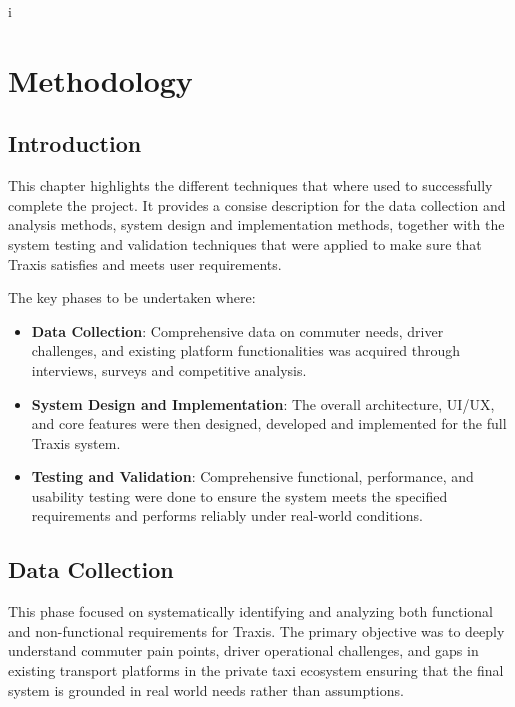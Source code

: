 i\chapter{Methodology}

\label{chap:methodology}

\section{Introduction}
This chapter highlights the different techniques that where used to successfully
complete the project. It provides a consise description for the data collection
and analysis methods, system design and implementation methods, together with
the system testing and validation techniques that were applied to make sure that
Traxis satisfies and meets user requirements. \vspace{1cm}


The key phases to be undertaken where:


\begin{itemize}
 \item \textbf{Data Collection}: Comprehensive data on commuter needs,
        driver challenges, and existing platform functionalities was acquired
        through interviews, surveys and competitive analysis.

 \item \textbf{System Design and Implementation}: The  overall
        architecture, UI/UX, and core features were then designed, developed and
        implemented for the full Traxis system.

 \item \textbf{Testing and Validation}: Comprehensive functional,
        performance, and usability testing were done to ensure the system meets
        the specified requirements and performs reliably under real-world
        conditions.

\end{itemize}

\section{Data Collection}
This phase focused on systematically identifying and analyzing both functional
and non-functional requirements for Traxis. The primary objective was to deeply
understand commuter pain points, driver operational challenges, and gaps in
existing transport platforms in the private taxi ecosystem ensuring that the
final system is grounded in real world needs rather than assumptions.


